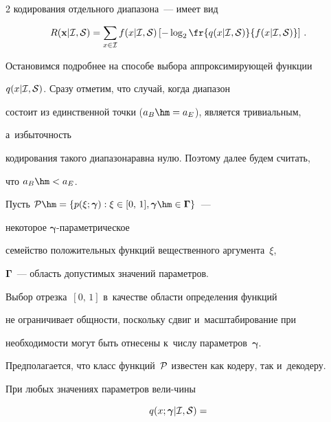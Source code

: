 \begin{multicols}{2}
кодирования отдельного диапазона~--- имеет вид

\begin{equation}

\label{eq19}

R(\mathbf{x}|{\cal I},{\cal S}) = \sum\limits_{x\in{\cal I}} f(x|{\cal I},{\cal S})

\left[ -\log_{2}\fr{q(x|{\cal I},{\cal S})}{f(x|{\cal I},{\cal S})}\right]\,.

\end{equation}



Остановимся подробнее на способе выбора аппроксимирующей функции 

$q(x|{\cal I},{\cal S})$. Сразу отметим, что случай, когда диапазон 

состоит из единственной точки ($a_B\hm=a_E$), является тривиальным,\linebreak

 а~избыточность 

кодирования такого диапазона\linebreak равна нулю. Поэтому далее будем считать, 

что $a_B\hm<a_E$. 



Пусть ${\cal P}\hm=\{p(\xi;\boldsymbol{\gamma}):\xi\in[0,\,1], 

\boldsymbol{\gamma}\hm\in\boldsymbol{\Gamma}\}$~--- 

некоторое $\boldsymbol{\gamma}$-па\-ра\-мет\-ри\-че\-ское 

семейство положительных функций вещественного аргумента~$\xi$,  

$\boldsymbol{\Gamma}$~--- область допустимых значений параметров. 

Выбор отрезка~$[0,\,1]$  в~качестве области определения функций 

не ограничивает общности, поскольку сдвиг и~масштабирование при 

необходимости могут быть отнесены к~числу параметров~$\boldsymbol{\gamma}$. 

Предполагается, что класс функций~$\cal{P}$ известен как кодеру, так и~декодеру. 

При любых значениях параметров вели-\linebreak чины

\begin{equation}

q(x;\boldsymbol{\gamma}|{\cal I},{\cal S}) = 


\end{equation}
\end{multicols}
